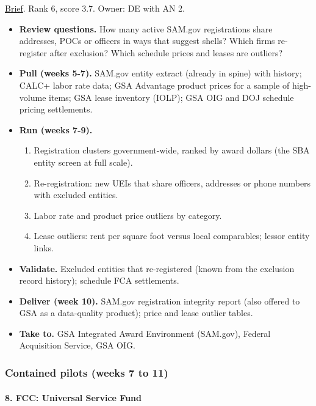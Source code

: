 \documentclass[letterpaper,11pt]{article}
\providecommand{\tightlist}{\setlength{\itemsep}{0pt}\setlength{\parskip}{0pt}}
\begin{document}
\href{agencies/gsa.pdf}{Brief}. Rank 6, score 3.7. Owner: DE with AN 2.

\begin{itemize}
\tightlist
\item
  \textbf{Review questions.} How many active SAM.gov registrations share
  addresses, POCs or officers in ways that suggest shells? Which firms
  re-register after exclusion? Which schedule prices and leases are
  outliers?
\item
  \textbf{Pull (weeks 5-7).} SAM.gov entity extract (already in spine)
  with history; CALC+ labor rate data; GSA Advantage product prices for
  a sample of high-volume items; GSA lease inventory (IOLP); GSA OIG and
  DOJ schedule pricing settlements.
\item
  \textbf{Run (weeks 7-9).}

  \begin{enumerate}
  \def\labelenumi{\arabic{enumi}.}
  \tightlist
  \item
    Registration clusters government-wide, ranked by award dollars (the
    SBA entity screen at full scale).
  \item
    Re-registration: new UEIs that share officers, addresses or phone
    numbers with excluded entities.
  \item
    Labor rate and product price outliers by category.
  \item
    Lease outliers: rent per square foot versus local comparables;
    lessor entity links.
  \end{enumerate}
\item
  \textbf{Validate.} Excluded entities that re-registered (known from
  the exclusion record history); schedule FCA settlements.
\item
  \textbf{Deliver (week 10).} SAM.gov registration integrity report
  (also offered to GSA as a data-quality product); price and lease
  outlier tables.
\item
  \textbf{Take to.} GSA Integrated Award Environment (SAM.gov), Federal
  Acquisition Service, GSA OIG.
\end{itemize}

\hypertarget{contained-pilots-weeks-7-to-11}{%
\subsubsection{Contained pilots (weeks 7 to
11)}\label{contained-pilots-weeks-7-to-11}}

\hypertarget{fcc-universal-service-fund}{%
\paragraph{8. FCC: Universal Service
Fund}\label{fcc-universal-service-fund}}
\end{document}
